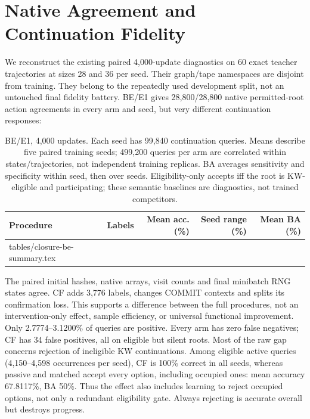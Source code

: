 \documentclass[10pt]{article}
\makeatletter
\let\closureinput\@@input
\makeatother
\begin{document}
\section{Native Agreement and Continuation Fidelity}
\label{sec:cf}
We reconstruct the existing paired 4,000-update diagnostics on 60 exact
teacher trajectories at sizes 28 and 36 per seed. Their graph/tape namespaces
are disjoint from training. They belong to the repeatedly used development
split, not an untouched final fidelity battery.
BE/E1 gives 28,800/28,800 native permitted-root action agreements in every
arm and seed, but very different continuation responses:
\begin{table}[htbp]\centering\small
\begin{tabular}{lrrrr}
\toprule Procedure & Labels & Mean acc. (\%) & Seed range (\%) & Mean BA (\%) \\
\midrule
\closureinput tables/closure-be-summary.tex
\bottomrule
\end{tabular}
\caption{BE/E1, 4,000 updates. Each seed has 99,840 continuation queries.
Means describe five paired training seeds; 499,200 queries per arm are
correlated within states/trajectories, not independent training replicas.
BA averages sensitivity and specificity within seed, then over seeds.
Eligibility-only accepts iff the root is KW-eligible and participating;
these semantic baselines are diagnostics, not trained competitors.}
\label{tab:be}
\end{table}
The paired initial hashes, native arrays, visit counts and final minibatch
RNG states agree. CF adds 3,776 labels, changes COMMIT contexts and splits
its confirmation loss. This supports a difference between the full
procedures, not an intervention-only effect, sample efficiency, or universal
functional improvement.
Only 2.7774--3.1200\% of queries are positive. Every arm has zero false
negatives; CF has 34 false positives, all on eligible but silent roots.
Most of the raw gap concerns rejection of ineligible KW continuations.
Among eligible active queries (4,150--4,598 occurrences per seed), CF is
100\% correct in all seeds, whereas passive and matched accept every option,
including occupied ones: mean accuracy 67.8117\%, BA 50\%. Thus the effect
also includes learning to reject occupied options, not only a redundant
eligibility gate. Always rejecting is accurate overall but destroys progress.
\end{document}

